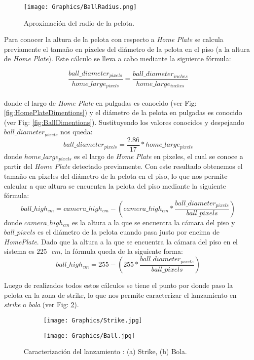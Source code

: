 \begin{figure}[!h]
    \centering
    \texttt{[image: Graphics/BallRadius.png]}
    \caption{Aproximación del radio de la pelota.}
    \label{fig:BallRadius}
\end{figure}

Para conocer la altura de la pelota con respecto a \textit{Home Plate} se calcula previamente el tamaño en pixeles del diámetro de la pelota en el piso (a la altura de \textit{Home Plate}). Este cálculo se lleva a cabo mediante la siguiente fórmula:

$$\frac{ball\_diameter_{pixels}}{home\_large_{pixels}} = \frac{ball\_diameter_{inches}}{home\_large_{inches}}$$\\
donde el largo de \textit{Home Plate} en pulgadas es conocido (ver Fig: \ref{fig:HomePlateDimentions}) y el diámetro de la pelota en pulgadas es conocido (ver Fig: \ref{fig:BallDimentions}). Sustituyendo los valores conocidos y despejando $ball\_diameter_{pixels}$ nos queda:
$$ball\_diameter_{pixels} = \frac{2.86}{17}*home\_large_{pixels}$$
donde $home\_large_{pixels}$ es el largo de \textit{Home Plate} en pixeles, el cual se conoce a partir del \textit{Home Plate} detectado previamente. Con este resultado obtenemos el tamaño en pixeles del diámetro de la pelota en el piso, lo que nos permite calcular a que altura se encuentra la pelota del piso mediante la siguiente fórmula:
$$ball\_high_{cm} = camera\_high_{cm} - (camera\_high_{cm}*\frac{ball\_diameter_{pixels}}{ball\_pixels})$$
donde $camera\_high_{cm}$ es la altura a la que se encuentra la cámara del piso y $ball\_pixels$ es el diámetro de la pelota cuando pasa justo por encima de \textit{HomePlate}. Dado que la altura a la que se encuentra la cámara del piso en el sistema es $225\text{ }cm$, la fórmula queda de la siguiente forma:
$$ball\_high_{cm} = 255 - (255*\frac{ball\_diameter_{pixels}}{ball\_pixels})$$

Luego de realizados todos estos cálculos se tiene el punto por donde paso la pelota en la zona de strike, lo que nos permite caracterizar el lanzamiento en \textit{strike} o \textit{bola} (ver Fig: \ref{fig:PitchCall}).

\begin{figure}[!h]
	\centering
	\begin{subfigure}[b]{0.45\linewidth}
		\texttt{[image: Graphics/Strike.jpg]}
		\caption{}
	\end{subfigure}
	\begin{subfigure}[b]{0.45\linewidth}
		\texttt{[image: Graphics/Ball.jpg]}
		\caption{}
	\end{subfigure}
	\caption{Caracterización del lanzamiento : (a) Strike, (b) Bola.}
	\label{fig:PitchCall}
\end{figure}

